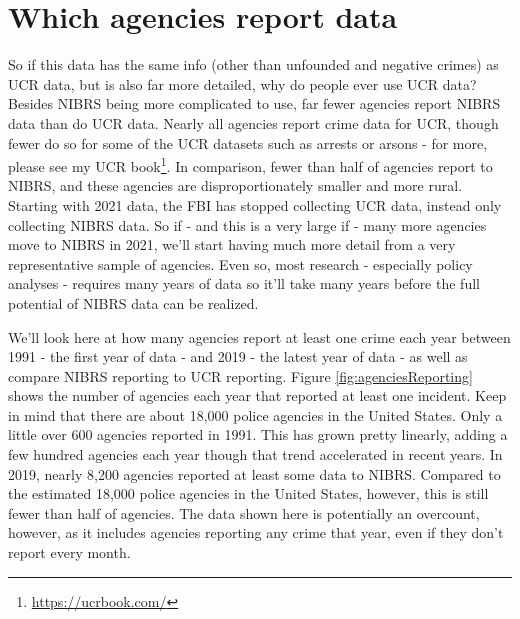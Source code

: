 \documentclass[
]{krantz}
\renewcommand{\href}[2]{#2\footnote{\url{#1}}}
\begin{document}
\section{Which agencies report
data}\label{which-agencies-report-data}

So if this data has the same info (other than unfounded and
negative crimes) as UCR data, but is also far more detailed,
why do people ever use UCR data? Besides NIBRS being more
complicated to use, far fewer agencies report NIBRS data
than do UCR data. Nearly all agencies report crime data for
UCR, though fewer do so for some of the UCR datasets such as
arrests or arsons - for more, please see my
\href{https://ucrbook.com/}{UCR book}. In comparison, fewer
than half of agencies report to NIBRS, and these agencies
are disproportionately smaller and more rural. Starting with
2021 data, the FBI has stopped collecting UCR data, instead
only collecting NIBRS data. So if - and this is a very large
if - many more agencies move to NIBRS in 2021, we'll start
having much more detail from a very representative sample of
agencies. Even so, most research - especially policy
analyses - requires many years of data so it'll take many
years before the full potential of NIBRS data can be
realized.

We'll look here at how many agencies report at least one
crime each year between 1991 - the first year of data - and
2019 - the latest year of data - as well as compare NIBRS
reporting to UCR reporting. Figure
\ref{fig:agenciesReporting} shows the number of agencies
each year that reported at least one incident. Keep in mind
that there are about 18,000 police agencies in the United
States. Only a little over 600 agencies reported in 1991.
This has grown pretty linearly, adding a few hundred
agencies each year though that trend accelerated in recent
years. In 2019, nearly 8,200 agencies reported at least some
data to NIBRS. Compared to the estimated 18,000 police
agencies in the United States, however, this is still fewer
than half of agencies. The data shown here is potentially an
overcount, however, as it includes agencies reporting any
crime that year, even if they don't report every month.
\end{document}
